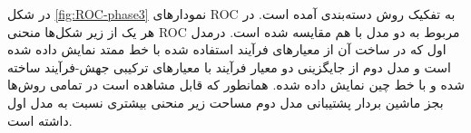 در شکل \ref{fig:ROC-phase3} نمودارهای ROC به تفکیک روش دسته‌بندی آمده است. در هر یک از زیر شکل‌ها منحنی ROC مربوط به  دو مدل با هم مقایسه شده است. درمدل اول که در ساخت آن از معیارهای فرآیند استفاده شده  با خط ممتد نمایش داده شده است و مدل دوم  از جایگزینی دو معیار فرآیند با معیارهای ترکیبی جهش-فرآیند ساخته شده و با خط چین نمایش داده شده‌. همانطور که قابل مشاهده است در تمامی روش‌ها بجز  ماشین بردار پشتیبانی مدل‌ دوم مساحت زیر منحنی بیشتری نسبت به مدل اول داشته است.
